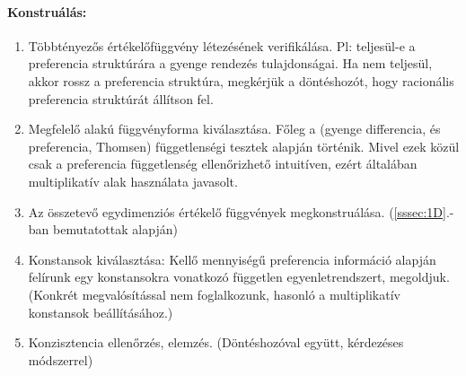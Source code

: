 \documentclass[a4paper,12pt]{article}
\begin{document}
\paragraph{Konstruálás: }

\begin{enumerate}
\item Többtényezős értékelőfüggvény létezésének verifikálása. Pl: teljesül-e a preferencia struktúrára a gyenge rendezés tulajdonságai. Ha nem teljesül, akkor rossz a preferencia struktúra, megkérjük a döntéshozót, hogy racionális preferencia struktúrát állítson fel. %
\item Megfelelő alakú függvényforma kiválasztása. Főleg a (gyenge differencia, és preferencia, Thomsen) függetlenségi tesztek alapján történik. Mivel ezek közül csak a preferencia függetlenség ellenőrizhető intuitíven, ezért általában multiplikatív alak használata javasolt.
\item Az összetevő egydimenziós értékelő függvények megkonstruálása. (\ref{sssec:1D}.-ban bemutatottak alapján)
\item Konstansok kiválasztása: Kellő mennyiségű preferencia információ alapján felírunk egy konstansokra vonatkozó független egyenletrendszert, megoldjuk. (Konkrét megvalósítással nem foglalkozunk, hasonló a multiplikatív konstansok beállításához.)
\item Konzisztencia ellenőrzés, elemzés. (Döntéshozóval együtt, kérdezéses módszerrel)
\end{enumerate}
\end{document}
